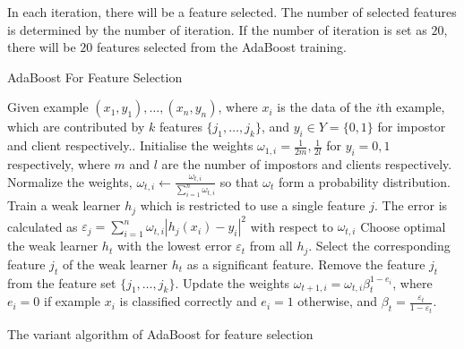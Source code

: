 In each iteration, there will be a feature selected. The number of selected features is determined by the number of iteration. If the number of iteration is set as $20$, there will be $20$ features selected from the AdaBoost training.
\begin{table}
AdaBoost For Feature Selection
\begin{algorithmic}[1]
\STATE Given example $(x_{1},y_{1}),\ldots,(x_{n},y_{n})$, where $x_{i}$ is the data of the $i$th example, which are contributed by $k$ features $\{j_{1},\ldots,j_{k}\}$, and $y_{i} \in Y=\{0,1\}$ for impostor and client respectively..
\STATE Initialise the weights $\omega_{1,i}=\frac{1}{2m},\frac{1}{2l}$ for $y_{i}=0,1$ respectively, where $m$ and $l$ are the number of impostors and clients respectively.
	\STATE Normalize the weights, $\omega_{t,i}\leftarrow\frac{\omega_{t,i}}{\sum_{i=1}^{n}\omega_{t,i}}$ so that $\omega_{t}$ form a probability distribution.
		\STATE Train a weak learner $h_{j}$ which is restricted to use a single feature $j$. 
		\STATE The error is calculated as $\varepsilon_{j}=\sum_{i=1}^{n}\omega_{t,i}|h_{j}(x_{i})-y_{i}|^{2}$ with respect to $\omega_{t,i}$
	\ENDFOR
	\STATE Choose optimal the weak learner $h_{t}$ with the lowest error $\varepsilon_{t}$ from all $h_{j}$.
	\STATE Select the corresponding feature $j_{t}$ of the weak learner $h_{t}$ as a significant feature.
	\STATE Remove the feature $j_{t}$ from the feature set $\{j_{1},\ldots,j_{k}\}$.
	\STATE Update the weights $\omega_{t+1,i}=\omega_{t,i}\beta_{t}^{1-e_{i}}$, where $e_{i}=0$ if example $x_{i}$ is classified correctly and $e_{i}=1$ otherwise, and $\beta_{t}=\frac{\varepsilon_{t}}{1-\varepsilon_{t}}$.	
\ENDFOR
\end{algorithmic}
\caption{The variant algorithm of AdaBoost for feature selection}
\label{tab:adaboostfs}
\end{table} 

